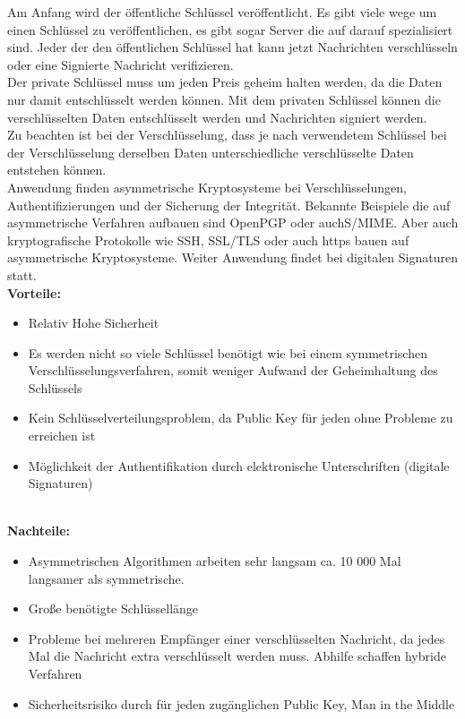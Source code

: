 \documentclass{article}
\begin{document}
Am Anfang wird der öffentliche Schlüssel veröffentlicht. Es gibt viele wege um einen Schlüssel zu veröffentlichen, es gibt sogar Server die auf darauf spezialisiert sind. Jeder der den öffentlichen Schlüssel hat kann jetzt Nachrichten verschlüsseln oder eine Signierte Nachricht verifizieren. \\

Der private Schlüssel muss um jeden Preis geheim halten werden, da die Daten nur damit entschlüsselt werden können. Mit dem privaten Schlüssel können die verschlüsselten Daten entschlüsselt werden und Nachrichten signiert werden.\\

Zu beachten ist bei der Verschlüsselung, dass je nach verwendetem Schlüssel bei der Verschlüsselung derselben Daten unterschiedliche verschlüsselte Daten entstehen können. \cite{2} \\


Anwendung finden asymmetrische Kryptosysteme bei Verschlüsselungen, Authentifizierungen und der Sicherung der Integrität. Bekannte Beispiele die auf asymmetrische Verfahren aufbauen sind OpenPGP oder auchS/MIME. Aber auch kryptografische Protokolle wie SSH, SSL/TLS oder auch https bauen auf asymmetrische Kryptosysteme. Weiter Anwendung findet bei digitalen Signaturen statt.\cite{2} \\

\textbf{Vorteile:}
\begin{itemize}
    \item Relativ Hohe Sicherheit
    \item Es werden nicht so viele Schlüssel benötigt wie bei einem symmetrischen Verschlüsselungsverfahren, somit weniger Aufwand der Geheimhaltung des Schlüssels
    \item Kein Schlüsselverteilungsproblem, da Public Key für jeden ohne Probleme zu erreichen ist
    \item Möglichkeit der Authentifikation durch elektronische Unterschriften (digitale Signaturen)
\end{itemize}
\cite{2} \\

\textbf{Nachteile:}
\begin{itemize}
    \item Asymmetrischen Algorithmen arbeiten sehr langsam ca. 10 000 Mal langsamer als symmetrische.
    \item Große benötigte Schlüssellänge
    \item Probleme bei mehreren Empfänger einer verschlüsselten Nachricht, da jedes Mal die Nachricht extra verschlüsselt werden muss. Abhilfe schaffen hybride Verfahren
    \item Sicherheitsrisiko durch für jeden zugänglichen Public Key, Man in the Middle
\end{itemize}
\cite{2}
\end{document}
